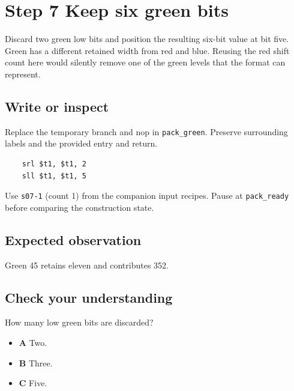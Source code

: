 \section{Step 7 Keep six green bits}\label{rgb-s07}

Discard two green low bits and position the resulting six-bit value at bit five. Green has a different retained width from red and blue. Reusing the red shift count here would silently remove one of the green levels that the format can represent.

\subsection{Write or inspect}
Replace the temporary branch and nop in \texttt{pack\_green}. Preserve surrounding labels and the provided entry and return.

\begin{verbatim}
    srl $t1, $t1, 2
    sll $t1, $t1, 5
\end{verbatim}
Use \texttt{s07-1} (count 1) from the companion input recipes. Pause at \texttt{pack\_ready} before comparing the construction state.

\subsection{Expected observation}
Green 45 retains eleven and contributes 352.

\subsection{Check your understanding}
How many low green bits are discarded?

\begin{itemize}
  \item \textbf{A} Two.
  \item \textbf{B} Three.
  \item \textbf{C} Five.
\end{itemize}
